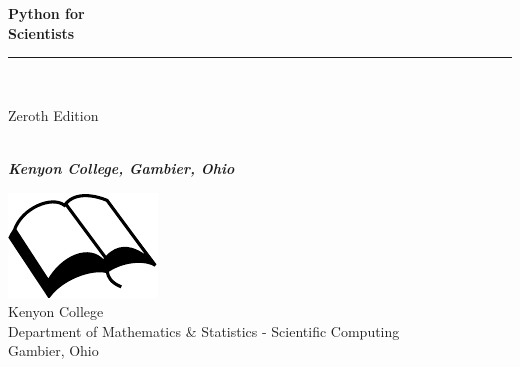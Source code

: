 \documentclass{book}
\makeatletter
\newcommand{\bookprinttitle}{Python for\\Scientists}
\newcommand{\booksubtitle}{Introduction to Python for Scientific Computing}
\newcommand{\authorsubtitle}{Kenyon College, Gambier, Ohio}
\newcommand{\bookauthor}{\@author}
\makeatother
\begin{document}

\restoregeometry


\thispagestyle{empty}


\begin{titlepage}
\begin{flushleft}

\textbf{\fontsize{48}{54}\selectfont \bookprinttitle}

\par\noindent\rule{\textwidth}{4pt}\\


\begin{flushright}
\Large Zeroth Edition
\end{flushright}

\vspace{\fill}

\textbf{\large \bookauthor}\\[3.5pt]
\textbf{\large \textit{\authorsubtitle}}

\vspace{\fill}

\begin{center}
\includegraphics{img/booksvg.pdf}\\[4pt]
\small{Kenyon College\\
Department of Mathematics \& Statistics - Scientific Computing\\
Gambier, Ohio}
\end{center}

\end{flushleft}
\end{titlepage}
\restoregeometry
\end{document}
